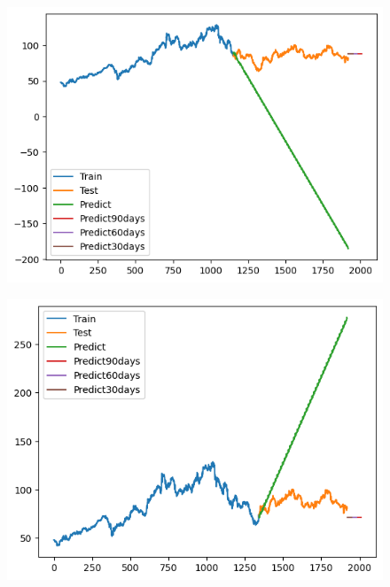 \documentclass[conference]{IEEEtran}
\begin{document}
\begin{figure}[H]
    \centering
    \begin{minipage}{0.15\textwidth}
    \centering
    \includegraphics[width=1\textwidth]{Image/ARIMA/SONY_6_4_Arima.png}
   
    \label{fig:1}
    \end{minipage}%
    \begin{minipage}{0.15\textwidth}
    \centering
    \includegraphics[width=1\textwidth]{Image/ARIMA/SONY_7_3_Arima.png}
  

\end{minipage}
\end{figure}
\end{document}
